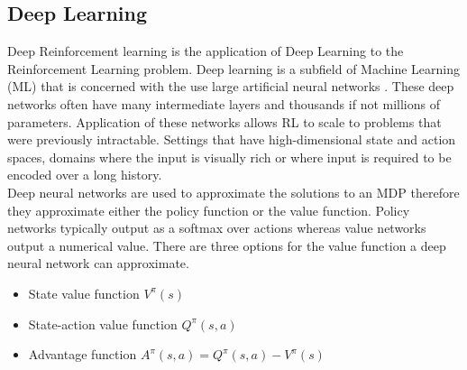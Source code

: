 \documentclass[10pt,journal,compsoc]{IEEEtran}
\begin{document}
\subsection{Deep Learning}
Deep Reinforcement learning is the application of Deep Learning to the Reinforcement Learning problem. Deep learning is a subfield of Machine Learning (ML) that is concerned with the use large artificial neural networks \cite{IEEEhowto:lecun}. These deep networks often have many intermediate layers and thousands if not millions of parameters. Application of these networks allows RL to scale to problems that were previously intractable. Settings that have high-dimensional state and action spaces, domains where the input is visually rich or where input is required to be encoded over a long history.
\\
Deep neural networks are used to approximate the solutions to an MDP therefore they approximate either the policy function or the value function. Policy networks typically output as a softmax over actions whereas value networks output a numerical value. There are three options for the value function a deep neural network can approximate.
\begin{itemize}
\item State value function \begin{math}V^\pi(s)\end{math}
\item State-action value function \begin{math}Q^\pi(s,a)\end{math}
\item Advantage function \begin{math}A^\pi(s,a)=Q^\pi(s,a)-V^\pi(s)\end{math}
\end{itemize}
\end{document}
